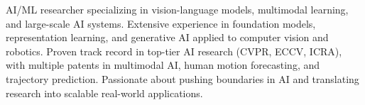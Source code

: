 


\begin{cventries}

\cvtext
{ %
\begin{cvitems}
AI/ML researcher specializing in vision-language models, multimodal learning, and large-scale AI systems. 
Extensive experience in foundation models, representation learning, and generative AI applied to computer vision and robotics. 
Proven track record in top-tier AI research (CVPR, ECCV, ICRA), with multiple patents in multimodal AI, human motion forecasting, and trajectory prediction. 
Passionate about pushing boundaries in AI and translating research into scalable real-world applications.
\end{cvitems}
}


\end{cventries}
